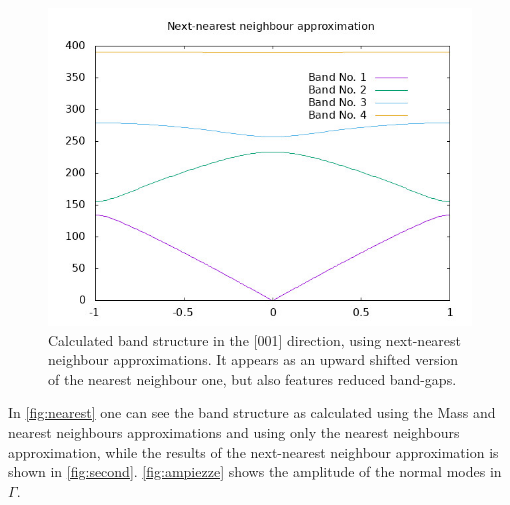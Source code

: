 \documentclass{article}
\begin{document}
\begin{figure}[ht]
	\centering
	\includegraphics[scale=0.3]{second.jpeg}
	\caption{Calculated band structure in the [001] direction, using next-nearest neighbour approximations. It appears as an upward shifted version of the nearest neighbour one, but also features reduced band-gaps.}
	\label{fig:second}
\end{figure}
In \autoref{fig:nearest} one can see the band structure as calculated using the Mass and nearest neighbours approximations and using only the nearest neighbours approximation, while the results of the next-nearest neighbour approximation is shown in \autoref{fig:second}. \autoref{fig:ampiezze} shows the amplitude of the normal modes in $\Gamma$.\par
\end{document}
